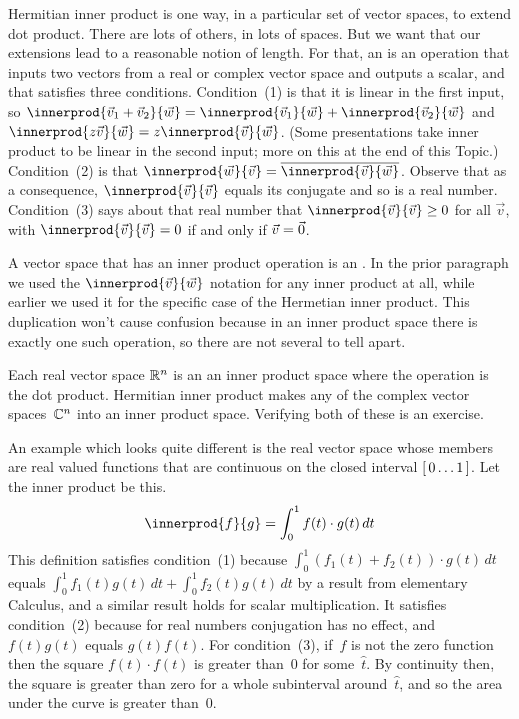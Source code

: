 Hermitian inner product is one way, in a particular set of vector spaces, 
to extend dot product.
There are lots of others, in lots of spaces.
But we want that our extensions lead to a reasonable notion of length.
For that,
an  is an operation
that inputs two vectors from a real or complex vector space 
and outputs a scalar, and that
satisfies three conditions.
Condition~(1) is that it is linear in the first input, so
$\innerprod{\vec{v}_1+\vec{v}_2}{\vec{w}}
 = \innerprod{\vec{v}_1}{\vec{w}}
   +\innerprod{\vec{v}_2}{\vec{w}}$
and $\innerprod{z\vec{v}}{\vec{w}}
     =z\innerprod{\vec{v}}{\vec{w}}$.
(Some presentations take inner product 
to be linear in the second input; more on this
at the end of this Topic.)
Condition~(2) is that
$\innerprod{\vec{w}}{\vec{v}}=\compconj{\innerprod{\vec{v}}{\vec{w}}}$.
Observe that as a consequence, 
$\innerprod{\vec{v}}{\vec{v}}$ equals its conjugate and
so is a real number.
Condition~(3) says about that real number that
$\innerprod{\vec{v}}{\vec{v}}\geq 0$ for all $\vec{v}$, with 
$\innerprod{\vec{v}}{\vec{v}}= 0$ if and only if $\vec{v}=\vec{0}$.

A vector space that has an inner product operation is an
.
In the prior paragraph we used the $\innerprod{\vec{v}}{\vec{w}}$ notation 
for any inner product at all, while earlier we used it for the specific case of
the Hermetian inner product.
This duplication won't cause confusion because in an inner product space there
is exactly one such operation, so there are not several to tell apart.

Each real vector space $\mathbb{R}^n$ is an an inner product space
where the operation is the dot product. 
Hermitian inner product makes any of the complex vector spaces~$\mathbb{C}^n$ into 
an inner product space.
Verifying both of these is an exercise.

An example which looks quite different 
is the real vector space whose members are
real valued functions that are continuous on the 
closed interval $[\,0\ldots 1\,]$.
Let the inner product be this.
\begin{equation*}
  \innerprod{f}{g}=\int_{0}^1 f(t)\cdot g(t)\,dt
\end{equation*}
This definition satisfies
condition~(1) because  
$\int_{0}^1 (f_1(t)+f_2(t))\cdot g(t)\,dt$ equals 
$\int_{0}^1 f_1(t)g(t)\,dt+\int_{0}^1 f_2(t)g(t)\,dt$
by a result from elementary Calculus,
and a similar result holds for scalar multiplication. 
It satisfies condition~(2) because for real numbers conjugation has no effect,
and $f(t)g(t)$ equals $g(t)f(t)$. 
For condition~(3), if~$f$ is not the zero function then 
the square $f(t)\cdot f(t)$ is greater than~$0$ for some~$\hat{t}$.
By continuity then, the square is greater than zero for a whole subinterval
around~$\hat{t}$,
and so the area under the curve is greater than~$0$.

